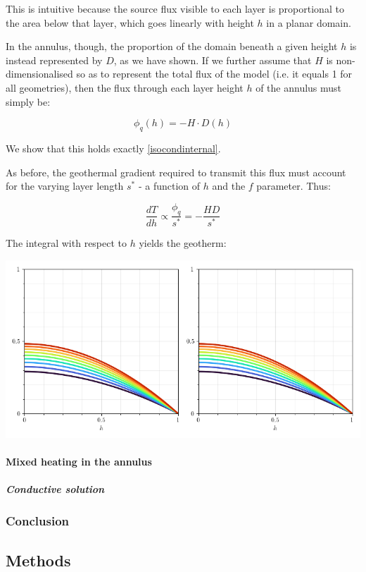 \documentclass[a4paper,11pt,oneside]{book}
\begin{document}
This is intuitive because the source flux visible to each layer is proportional to the area below that layer, which goes linearly with height $h$ in a planar domain.

In the annulus, though, the proportion of the domain beneath a given height $h$ is instead represented by $D$, as we have shown. If we further assume that $H$ is non-dimensionalised so as to represent the total flux of the model (i.e. it equals 1 for all geometries), then the flux through each layer height $h$ of the annulus must simply be:

\begin{equation}
{\phi_q}(h) = -H \cdot D(h)
\end{equation}

We show that this holds exactly \ref{isocondinternal}.

As before, the geothermal gradient required to transmit this flux must account for the varying layer length $s^{*}$ - a function of $h$ and the $f$ parameter. Thus:

\begin{equation}
\frac{dT}{dh} \propto \frac{\phi_q}{s^{*}} = -\frac{HD}{s^{*}}
\end{equation}

The integral with respect to $h$ yields the geotherm:

\includegraphics[width=0.7\linewidth]{files/f584a98f5b3d859cd64a1a5095d25dd2.png}

\paragraph{Mixed heating in the annulus}

\subparagraph{Conductive solution}

\subsubsection{Conclusion}

\subsection{Methods}
\end{document}
